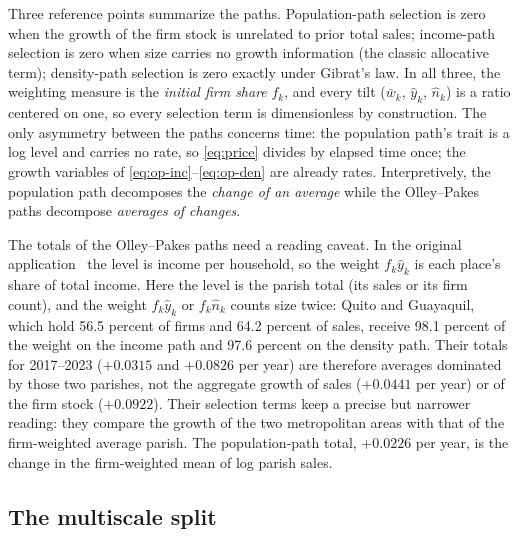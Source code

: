 \documentclass[conference]{IEEEtran}
\begin{document}
Three reference points summarize the paths. Population-path selection is
zero when the growth of the firm stock is unrelated to prior total sales; income-path
selection is zero when size carries no growth information (the classic
allocative term); density-path selection is zero exactly under Gibrat's
law. In all three, the weighting measure is the \textit{initial firm
share} $f_k$, and every tilt ($\bar w_k$, $\hat y_k$, $\hat n_k$) is a
ratio centered on one, so every selection term is dimensionless by
construction. The only asymmetry between the paths concerns time: the
population path's trait is a log level and carries no rate, so
\eqref{eq:price} divides by elapsed time once; the growth variables of
\eqref{eq:op-inc}--\eqref{eq:op-den} are already rates. Interpretively,
the population path decomposes the \textit{change of an average} while the
Olley--Pakes paths decompose \textit{averages of changes}.

The totals of the Olley--Pakes paths need a reading caveat. In the
original application~\cite{kemp2025} the level is income per household,
so the weight $f_k \hat y_k$ is each place's share of total income. Here
the level is the parish total (its sales or its firm count), and the
weight $f_k \hat y_k$ or $f_k \hat n_k$ counts size twice: Quito and
Guayaquil, which hold 56.5 percent of firms and 64.2 percent of sales,
receive 98.1 percent of the weight on the income path and 97.6 percent on
the density path. Their totals for 2017--2023 ($+0.0315$ and $+0.0826$ per
year) are therefore averages dominated by those two parishes, not the
aggregate growth of sales ($+0.0441$ per year) or of the firm stock
($+0.0922$). Their selection terms keep a precise but narrower reading:
they compare the growth of the two metropolitan areas with that of the
firm-weighted average parish. The population-path total, $+0.0226$ per
year, is the change in the firm-weighted mean of log parish sales.

\subsection{The multiscale split}
\end{document}
